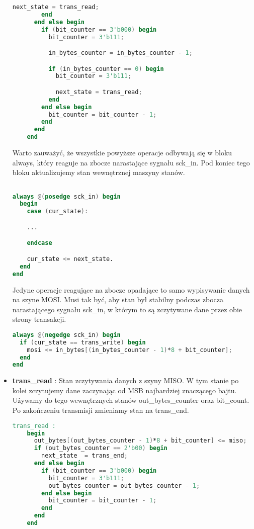 \documentclass[a4paper,12pt]{article}
\begin{document}
\begin{itemize}
\begin{lstlisting}[language=verilog]
          next_state = trans_read;
        end
      end else begin
        if (bit_counter == 3'b000) begin
          bit_counter = 3'b111;

          in_bytes_counter = in_bytes_counter - 1;

          if (in_bytes_counter == 0) begin
            bit_counter = 3'b111;

            next_state = trans_read;
          end
        end else begin
          bit_counter = bit_counter - 1;
        end
      end
    end
\end{lstlisting}

Warto zauważyć, że wszystkie powyższe operacje odbywają się w bloku always, który reaguje na zbocze narastające sygnału sck\_in. Pod koniec tego bloku aktualizujemy stan wewnętrznej maszyny stanów.

\begin{lstlisting}[language=verilog]

always @(posedge sck_in) begin
  begin
    case (cur_state):

    ...

    endcase

    cur_state <= next_state.
  end
end

\end{lstlisting}

Jedyne operacje reagujące na zbocze opadające to samo wypisywanie danych na szyne MOSI. Musi tak być, aby stan był stabilny podczas zbocza narastającego sygnału sck\_in, w którym to są zczytywane dane przez obie strony transakcji.

\begin{lstlisting}[language=verilog]
always @(negedge sck_in) begin
  if (cur_state == trans_write) begin
    mosi <= in_bytes[(in_bytes_counter - 1)*8 + bit_counter];
  end
end
\end{lstlisting}

  \item \textbf{trans\_read} : Stan zczytywania danych z szyny MISO. W tym stanie po kolei zczytujemy dane zaczynając od MSB najbardziej znaczącego bajtu. Używamy do tego wewnętrznych stanów out\_bytes\_counter oraz bit\_count. Po zakończeniu transmisji zmieniamy stan na trans\_end.

\begin{lstlisting}[language=verilog]
trans_read :
    begin
      out_bytes[(out_bytes_counter - 1)*8 + bit_counter] <= miso;
      if (out_bytes_counter == 2'b00) begin
        next_state  = trans_end;
      end else begin
        if (bit_counter == 3'b000) begin
          bit_counter = 3'b111;
          out_bytes_counter = out_bytes_counter - 1;
        end else begin
          bit_counter = bit_counter - 1;
        end
      end
    end
\end{lstlisting}


\end{itemize}
\end{document}
